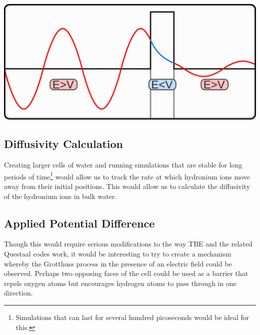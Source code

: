 \documentclass{article}
\newenvironment{Figure}{\par\medskip\noindent\minipage{\linewidth}}{\endminipage\par\medskip}
\begin{document}
\begin{multicols}{2}
\begin{Figure}
	\includegraphics[width=\textwidth]{figures/tunneling.png}
	\label{fig:tunnelling}	
\end{Figure}

\subsection{Diffusivity Calculation}
Creating larger cells of water and running simulations that are stable for long periods of time\footnote{Simulations that can last for several hundred picoseconds would be ideal for this.} would allow us to track the rate at which hydronium ions move away from their initial positions. This would allow us to calculate the diffusivity of the hydronium ions in bulk water.

\subsection{Applied Potential Difference}
Though this would require serious modifications to the way TBE and the related Questaal codes work, it would be interesting to try to create a mechanism whereby the Grotthuss process in the presence of an electric field could be observed. Perhaps two opposing faces of the cell could be used as a barrier that repels oxygen atoms but encourages hydrogen atoms to pass through in one direction.


\end{multicols}
\end{document}
